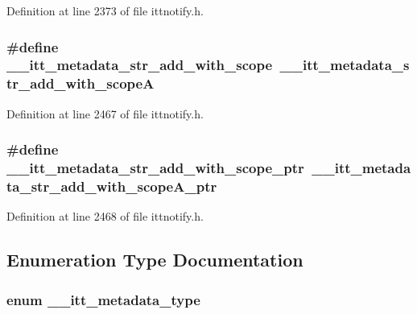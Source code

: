 Definition at line 2373 of file ittnotify.\-h.

\hypertarget{group__metadata_gad1d57296dfdaf252ba36eedc7954bd20}{
\subsubsection[{\-\_\-\-\_\-itt\-\_\-metadata\-\_\-str\-\_\-add\-\_\-with\-\_\-scope}]{\setlength{\rightskip}{0pt plus 5cm}\#define \-\_\-\-\_\-itt\-\_\-metadata\-\_\-str\-\_\-add\-\_\-with\-\_\-scope~{\bf \-\_\-\-\_\-itt\-\_\-metadata\-\_\-str\-\_\-add\-\_\-with\-\_\-scope\-A}}}\label{group__metadata_gad1d57296dfdaf252ba36eedc7954bd20}


Definition at line 2467 of file ittnotify.\-h.

\hypertarget{group__metadata_gab7da5c687a7bd71d3206bfb1bfcf0e91}{
\subsubsection[{\-\_\-\-\_\-itt\-\_\-metadata\-\_\-str\-\_\-add\-\_\-with\-\_\-scope\-\_\-ptr}]{\setlength{\rightskip}{0pt plus 5cm}\#define \-\_\-\-\_\-itt\-\_\-metadata\-\_\-str\-\_\-add\-\_\-with\-\_\-scope\-\_\-ptr~\-\_\-\-\_\-itt\-\_\-metadata\-\_\-str\-\_\-add\-\_\-with\-\_\-scope\-A\-\_\-ptr}}\label{group__metadata_gab7da5c687a7bd71d3206bfb1bfcf0e91}


Definition at line 2468 of file ittnotify.\-h.



\subsection{Enumeration Type Documentation}
\hypertarget{group__metadata_ga906320efadd24c37fc2ee021e880a673}{
\subsubsection[{\-\_\-\-\_\-itt\-\_\-metadata\-\_\-type}]{\setlength{\rightskip}{0pt plus 5cm}enum {\bf \-\_\-\-\_\-itt\-\_\-metadata\-\_\-type}}}\label{group__metadata_ga906320efadd24c37fc2ee021e880a673}


